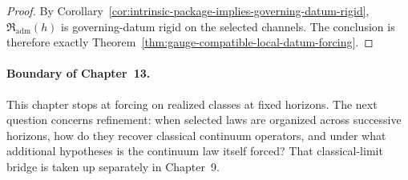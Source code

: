 \begin{proof}
By Corollary~\ref{cor:intrinsic-package-implies-governing-datum-rigid},
$\mathfrak R_{\mathrm{adm}}(h)$ is governing-datum rigid on the selected
channels. The conclusion is therefore exactly
Theorem~\ref{thm:gauge-compatible-local-datum-forcing}.
\end{proof}

\paragraph{Boundary of Chapter~13.}
\label{rem:part-two-boundary}
This chapter stops at forcing on realized classes at fixed horizons. The next
question concerns refinement: when selected laws are organized across
successive horizons, how do they recover classical continuum operators, and
under what additional hypotheses is the continuum law itself forced? That
classical-limit bridge is taken up separately in Chapter~9.
